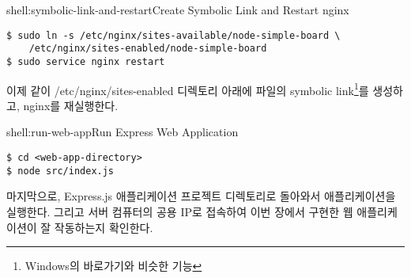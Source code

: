 \begin{shellenv}{shell:symbolic-link-and-restart}{Create Symbolic Link and Restart nginx}\begin{verbatim}
$ sudo ln -s /etc/nginx/sites-available/node-simple-board \
    /etc/nginx/sites-enabled/node-simple-board
$ sudo service nginx restart
\end{verbatim}
\end{shellenv}

이제 \와 같이 /etc/nginx/sites-enabled 디렉토리 아래에  파일의 symbolic link\footnote{Windows의 바로가기와 비슷한 기능}를 생성하고, nginx를 재실행한다.

\begin{shellenv}{shell:run-web-app}{Run Express Web Application}\begin{verbatim}
$ cd <web-app-directory>
$ node src/index.js
\end{verbatim}
\end{shellenv}

마지막으로, Express.js 애플리케이션 프로젝트 디렉토리로 돌아와서 애플리케이션을 실행한다. 그리고 서버 컴퓨터의 공용 IP로 접속하여 이번 장에서 구현한 웹 애플리케이션이 잘 작동하는지 확인한다.

